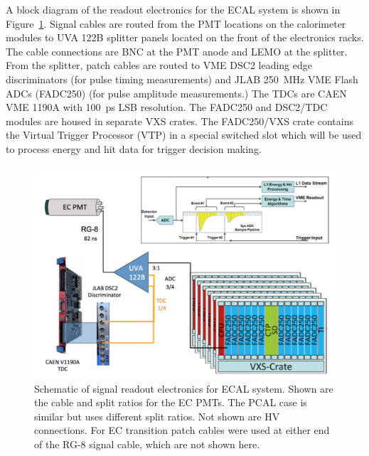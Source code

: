 \documentclass[letterpaper,10pt]{article}
\begin{document}
\newpage

A block diagram of the readout electronics for the ECAL system is shown in 
Figure~\ref{readout-elec}. Signal cables are routed from the PMT locations on the calorimeter
modules to UVA 122B splitter panels located on the front of the electronics racks. The cable
connections are BNC at the PMT anode and LEMO at the splitter.  From the splitter, patch cables
are routed to VME DSC2 leading edge discriminators (for pulse timing measurements) and JLAB 250~MHz VME Flash
ADCs (FADC250) (for pulse amplitude measurements.)  The TDCs are CAEN VME 1190A with 100~ps LSB resolution.
The FADC250 and DSC2/TDC modules are housed in separate VXS crates.  The FADC250/VXS crate contains the
Virtual Trigger Processor (VTP) in a special switched slot which will be used to process energy and hit data for
trigger decision making.

\begin{figure}[htbp]
  \centering
  \includegraphics[width= 7in, keepaspectratio = true]{readout-electronics}
  \vspace{2mm}
  \caption{Schematic of signal readout electronics for ECAL system.  Shown are the cable and split ratios for the EC
    PMTs.  The PCAL case is similar but uses different split ratios.  Not shown are HV connections.  For EC transition patch cables were used at either end of the RG-8 signal cable, which are not shown here.
  }
  \label{readout-elec} 
\end{figure}
\end{document}
